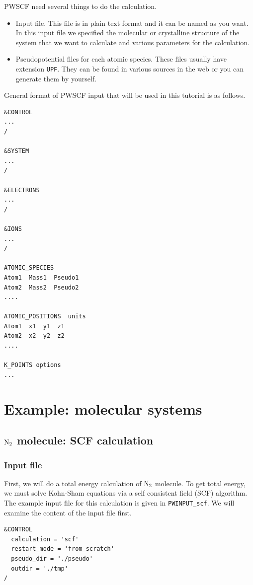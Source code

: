 \documentclass[12pt,english]{paper}
\begin{document}
PWSCF need several things to do the calculation.
\begin{itemize}
\item Input file. This file is in plain text format and it can be named
as you want. In this input file we specified the molecular or crystalline
structure of the system that we want to calculate and various parameters
for the calculation.
\item Pseudopotential files for each atomic species. These files usually
have extension \texttt{UPF}. They can be found in various sources
in the web or you can generate them by yourself.
\end{itemize}
General format of PWSCF input that will be used in this tutorial is
as follows.

\begin{lstlisting}
&CONTROL
...
/

&SYSTEM
...
/

&ELECTRONS
...
/

&IONS
...
/

ATOMIC_SPECIES
Atom1  Mass1  Pseudo1
Atom2  Mass2  Pseudo2
....

ATOMIC_POSITIONS  units
Atom1  x1  y1  z1
Atom2  x2  y2  z2
....

K_POINTS options
...
\end{lstlisting}



\section{Example: molecular systems}


\subsection{$\ce{N2}$ molecule: SCF calculation}


\subsubsection{Input file}

First, we will do a total energy calculation of $\ce{N2}$ molecule.
To get total energy, we must solve Kohn-Sham equations via a self
consistent field (SCF) algorithm. The example input file for this
calculation is given in \texttt{PWINPUT\_scf}. We will examine the
content of the input file first.

\begin{lstlisting}
&CONTROL
  calculation = 'scf'
  restart_mode = 'from_scratch'
  pseudo_dir = './pseudo'
  outdir = './tmp'
/
\end{lstlisting}
\end{document}
